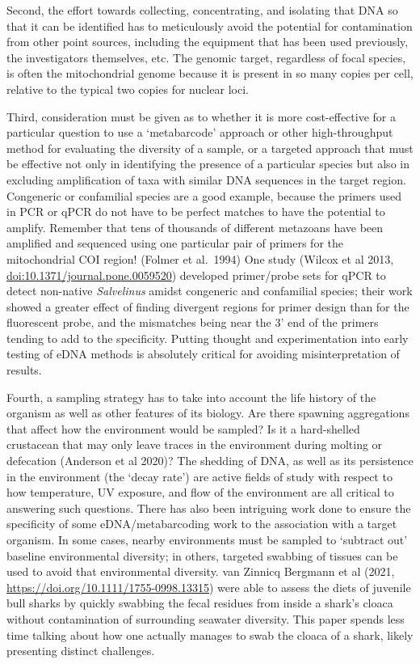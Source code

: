 \documentclass[
]{article}
\begin{document}
Second, the effort towards collecting, concentrating, and isolating that
DNA so that it can be identified has to meticulously avoid the potential
for contamination from other point sources, including the equipment that
has been used previously, the investigators themselves, etc. The genomic
target, regardless of focal species, is often the mitochondrial genome
because it is present in so many copies per cell, relative to the
typical two copies for nuclear loci.

Third, consideration must be given as to whether it is more
cost-effective for a particular question to use a `metabarcode' approach
or other high-throughput method for evaluating the diversity of a
sample, or a targeted approach that must be effective not only in
identifying the presence of a particular species but also in excluding
amplification of taxa with similar DNA sequences in the target region.
Congeneric or confamilial species are a good example, because the
primers used in PCR or qPCR do not have to be perfect matches to have
the potential to amplify. Remember that tens of thousands of different
metazoans have been amplified and sequenced using one particular pair of
primers for the mitochondrial COI region! (Folmer et al.~1994) One study
(Wilcox et al 2013, \url{doi:10.1371/journal.pone.0059520}) developed
primer/probe sets for qPCR to detect non-native \emph{Salvelinus} amidst
congeneric and confamilial species; their work showed a greater effect
of finding divergent regions for primer design than for the fluorescent
probe, and the mismatches being near the 3' end of the primers tending
to add to the specificity. Putting thought and experimentation into
early testing of eDNA methods is absolutely critical for avoiding
misinterpretation of results.

Fourth, a sampling strategy has to take into account the life history of
the organism as well as other features of its biology. Are there
spawning aggregations that affect how the environment would be sampled?
Is it a hard-shelled crustacean that may only leave traces in the
environment during molting or defecation (Anderson et al 2020)? The
shedding of DNA, as well as its persistence in the environment (the
`decay rate') are active fields of study with respect to how
temperature, UV exposure, and flow of the environment are all critical
to answering such questions. There has also been intriguing work done to
ensure the specificity of some eDNA/metabarcoding work to the
association with a target organism. In some cases, nearby environments
must be sampled to `subtract out' baseline environmental diversity; in
others, targeted swabbing of tissues can be used to avoid that
environmental diversity. van Zinnicq Bergmann et al (2021,
\url{https://doi.org/10.1111/1755-0998.13315}) were able to assess the
diets of juvenile bull sharks by quickly swabbing the fecal residues
from inside a shark's cloaca without contamination of surrounding
seawater diversity. This paper spends less time talking about how one
actually manages to swab the cloaca of a shark, likely presenting
distinct challenges.
\end{document}
